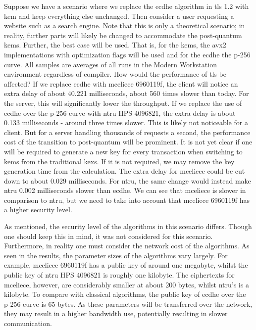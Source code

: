 Suppose we have a scenario where we replace the \gls{ecdhe} algorithm in \gls{tls} 1.2 with \gls{kem} and keep everything else unchanged. Then consider a user requesting a website such as a search engine. Note that this is only a theoretical scenario; in reality, further parts will likely be changed to accommodate the \gls{post-quantum} \glspl{kem}. Further, the best case will be used. That is, for the \glspl{kem}, the \gls{avx2} implementations with optimization flags will be used and for the \gls{ecdhe} the \gls{p-256} curve. All samples are averages of all runs in the Modern Workstation environment regardless of compiler. How would the performance of \gls{tls} be affected? If we replace \gls{ecdhe} with \gls{mceliece} 6960119f, the client will notice an extra delay of about 40.221 milliseconds, about 560 times slower than today. For the server, this will significantly lower the throughput. If we replace the use of \gls{ecdhe} over the \gls{p-256} curve with \gls{ntru} HPS 4096821, the extra delay is about 0.133 milliseconds - around three times slower. This is likely not noticeable for a client. But for a server handling thousands of requests a second, the performance cost of the transition to post-quantum will be prominent. It is not yet clear if one will be required to generate a new key for every transaction when switching to \glspl{kem} from the traditional \glspl{kex}. If it is not required, we may remove the key generation time from the calculation. The extra delay for \gls{mceliece} could be cut down to about 0.029 milliseconds. For \gls{ntru}, the same change would instead make \gls{ntru} 0.002 milliseconds slower than \gls{ecdhe}. We can see that \gls{mceliece} is slower in comparison to \gls{ntru}, but we need to take into account that \gls{mceliece} 6960119f has a higher security level.

As mentioned, the security level of the algorithms in this scenario differs. Though one should keep this in mind, it was not considered for this scenario. Furthermore, in reality one must consider the network cost of the algorithms. As seen in the results, the parameter sizes of the algorithms vary largely. For example, \gls{mceliece} 6960119f has a public key of around one megabyte, whilst the public key of \gls{ntru} HPS 4096821 is roughly one kilobyte. The ciphertexts for \gls{mceliece}, however, are considerably smaller at about 200 bytes, whilst \gls{ntru}'s is a kilobyte. To compare with classical algorithms, the public key of \gls{ecdhe} over the \gls{p-256} curve is 65 bytes. As these parameters will be transferred over the network, they may result in a higher bandwidth use, potentially resulting in slower communication.

